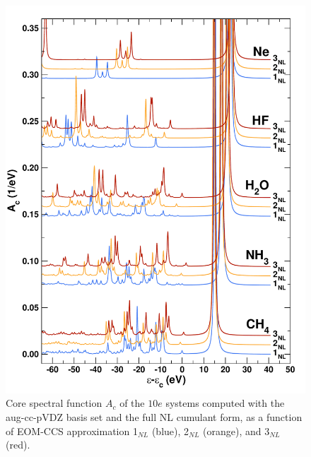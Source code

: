 \documentclass[aps,prb,twocolumn,groupaddress,floatfix]{revtex4}
\begin{document}
\begin{figure}[t]
\includegraphics[scale=0.40,clip]{Fig01.pdf}
\caption{\label{fig:10eac}
Core spectral function $A_c$ of the $10e$ systems computed with the aug-cc-pVDZ basis set and the full NL cumulant form, as a function of EOM-CCS approximation 1$_{NL}$ (blue), 2$_{NL}$ (orange), and 3$_{NL}$ (red).
}
\end{figure}
\end{document}
